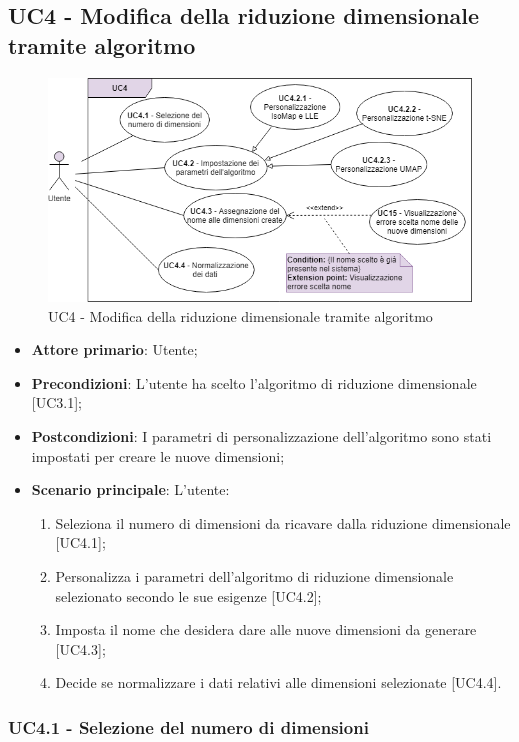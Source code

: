 \subsection{UC4 - Modifica della riduzione dimensionale tramite algoritmo}
\begin{figure}[h]
\includegraphics[width=\linewidth]{Section/Images/UC4.png}
\centering
\caption{UC4 - Modifica della riduzione dimensionale tramite algoritmo}
\end{figure}
\begin{itemize}
	\item \textbf{Attore primario}: Utente;
	\item \textbf{Precondizioni}: L'utente ha scelto l'algoritmo di riduzione dimensionale [UC3.1];
	\item \textbf{Postcondizioni}: I parametri di personalizzazione dell'algoritmo sono stati impostati per creare le nuove dimensioni;
	\item \textbf{Scenario principale}: L'utente:
	
	\begin{enumerate}
		\item Seleziona il numero di dimensioni da ricavare dalla riduzione dimensionale [UC4.1];
		\item Personalizza i parametri dell'algoritmo di riduzione dimensionale selezionato secondo le sue esigenze [UC4.2];
		\item Imposta il nome che desidera dare alle nuove dimensioni da generare [UC4.3];
		\item Decide se normalizzare i dati relativi alle dimensioni selezionate [UC4.4].
	\end{enumerate}		
\end{itemize}

\subsubsection{UC4.1 - Selezione del numero di dimensioni}

